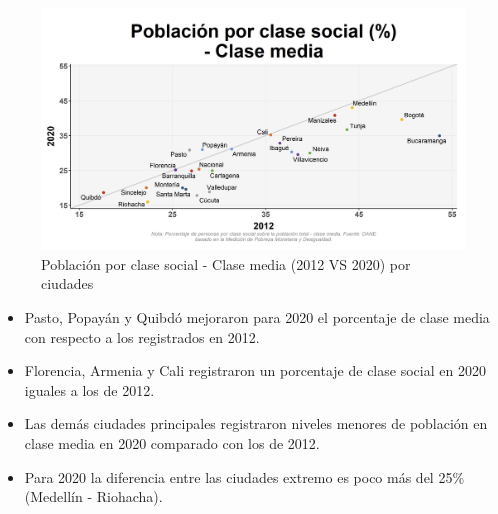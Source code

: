     \begin{figure}[H]
        \caption{Población por clase social - Clase media (2012 VS 2020) por ciudades \label{map_result_2} }
        \begin{center}
        \includegraphics[width=\textwidth,keepaspectratio]{img/var_247_scatter_time.png}
        \end{center}
    \end{figure}
            \begin{itemize}
                    \item Pasto, Popayán y Quibdó mejoraron para 2020 el porcentaje de clase media con respecto a los registrados en 2012.
                    \item Florencia, Armenia y Cali registraron un porcentaje de clase social en 2020 iguales a los de 2012.
                    \item Las demás ciudades principales registraron niveles menores de población en clase media en 2020 comparado con los de 2012.
                    \item Para 2020 la diferencia entre las ciudades extremo es poco más del 25\% (Medellín - Riohacha).
                    \end{itemize}

